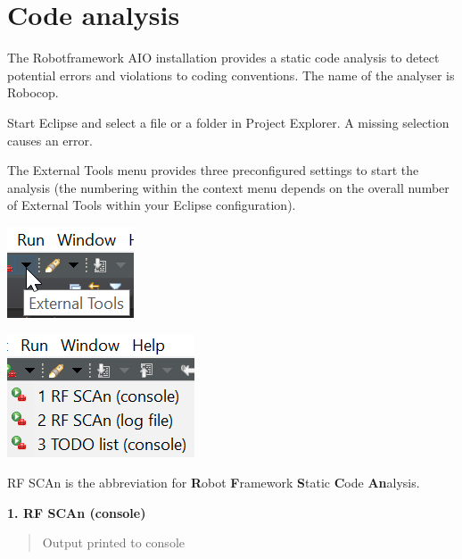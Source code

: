%
%
%
\chapter{Code analysis}

The Robotframework AIO installation provides a static code analysis to detect potential errors and violations to coding conventions.
The name of the analyser is \textquotedbl{}Robocop\textquotedbl{}.

Start Eclipse and select a file or a folder in Project Explorer. A missing selection causes an error.

The External Tools menu provides three preconfigured settings to start the analysis (the numbering within the context menu
depends on the overall number of External Tools within your Eclipse configuration).

\includegraphics{./include/graphics/code_analysis/ExternalTools}

\includegraphics{./include/graphics/code_analysis/ContextMenu}

RF SCAn is the abbreviation for \textquotedbl{}\textbf{R}obot \textbf{F}ramework \textbf{S}tatic \textbf{C}ode \textbf{An}alysis\textquotedbl{}.

\textbf{1. RF SCAn (console)}
\begin{quote}
Output printed to console
\end{quote}

